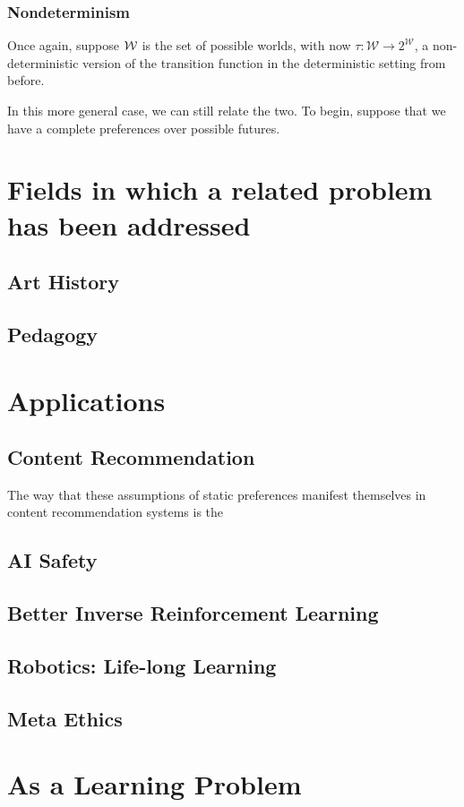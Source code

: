 \documentclass{book}
\begin{document}
	
	\subsubsection{Nondeterminism}
	Once again, suppose $\cal W$ is the set of possible worlds, with now $\tau: \mathcal W \to 2^{\mathcal W}$, a non-deterministic version of the transition function in the deterministic setting from before.
	
	In this more general case, we can still relate the two. To begin, suppose that we have a complete preferences over possible futures. 
	
	
	\section{Fields in which a related problem has been addressed}
	
	\subsection{Art History} %
	\subsection{Pedagogy} %
	\subsection{}
	
	
	\section{Applications}
	
	\subsection{Content Recommendation}
	The way that these assumptions of static preferences manifest themselves in content recommendation systems is the
	
	\subsection{AI Safety}
	\subsection{Better Inverse Reinforcement Learning}
	\subsection{Robotics: Life-long Learning}
	\subsection{Meta Ethics}
	
	\section{As a Learning Problem}
	
	
\end{document}
